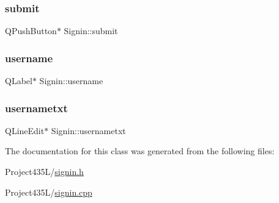 \subsubsection{\texorpdfstring{submit}{submit}}
{\footnotesize\ttfamily Q\+Push\+Button$\ast$ Signin\+::submit}

\mbox{\label{classSignin_ab608f7654e8d2cb405b1739151f1c83f}} 
\subsubsection{\texorpdfstring{username}{username}}
{\footnotesize\ttfamily Q\+Label$\ast$ Signin\+::username}

\mbox{\label{classSignin_a3c5f17e8afe4ab6b7a4d153329902e0f}} 
\subsubsection{\texorpdfstring{usernametxt}{usernametxt}}
{\footnotesize\ttfamily Q\+Line\+Edit$\ast$ Signin\+::usernametxt}



The documentation for this class was generated from the following files\+:\begin{DoxyCompactItemize}
\item 
Project435\+L/\hyperlink{signin_8h}{signin.\+h}\item 
Project435\+L/\hyperlink{signin_8cpp}{signin.\+cpp}\end{DoxyCompactItemize}
